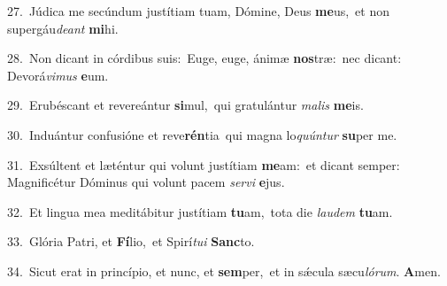 {\numbfont\textcolor{\numbcolor}{27.}}~Júdica me secúndum justítiam tuam, Dómine, Deus \textbf{me}\-us,~\star et non supergáu\-\textit{de}\-\textit{ant} \textbf{mi}\-hi.\par
{\numbfont\textcolor{\numbcolor}{28.}}~Non dicant in córdibus suis:~\dagger Euge, euge, ánimæ \textbf{nos}\-træ:~\star nec dicant: Devorá\-\textit{vi}\-\textit{mus} \textbf{e}\-um.\par
{\numbfont\textcolor{\numbcolor}{29.}}~Erubéscant et revereántur \textbf{si}\-mul,~\star qui gratulántur \textit{ma}\-\textit{lis} \textbf{me}\-is.\par
{\numbfont\textcolor{\numbcolor}{30.}}~Induántur confusióne et reve\-\textbf{rén}\-tia~\star qui magna lo\-\textit{quún}\-\textit{tur} \textbf{su}\-per me.\par
{\numbfont\textcolor{\numbcolor}{31.}}~Exsúltent et læténtur qui volunt justítiam \textbf{me}\-am:~\star et dicant semper: Magnificétur Dóminus qui volunt pacem \textit{ser}\-\textit{vi} \textbf{e}\-jus.\par
{\numbfont\textcolor{\numbcolor}{32.}}~Et lingua mea meditábitur justítiam \textbf{tu}\-am,~\star tota die \textit{lau}\-\textit{dem} \textbf{tu}\-am.\par
{\numbfont\textcolor{\numbcolor}{33.}}~Glória Patri, et \textbf{Fí}\-lio,~\star et Spirí\-\textit{tu}\-\textit{i} \textbf{Sanc}\-to.\par
{\numbfont\textcolor{\numbcolor}{34.}}~Sicut erat in princípio, et nunc, et \textbf{sem}\-per,~\star et in sǽcula sæcu\-\textit{ló}\-\textit{rum}. \textbf{A}\-men.\par
